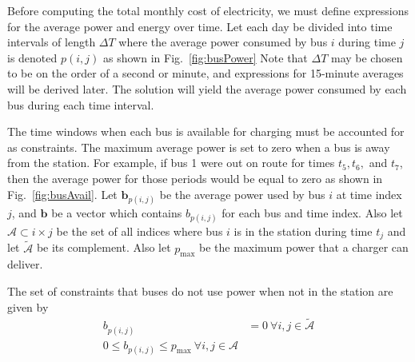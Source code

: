 Before computing the total monthly cost of electricity, we must define expressions for the average power and energy over time.  Let each day be divided into time intervals of length $\Delta T$ where the average power consumed by bus $i$ during time $j$ is denoted $p(i,j)$ as shown in Fig.~\ref{fig:busPower} Note that $\Delta T$ may be chosen to be on the order of a second or minute, and expressions for 15-minute averages will be derived later. The solution will yield the average power consumed by each bus during each time interval.
\par The time windows when each bus is available for charging must be accounted for as constraints.  The maximum average power is set to zero when a bus is away from the station. For example, if bus 1 were out on route for times $t_5, t_6,$ and $t_7$, then the average power for those periods would be equal to zero as shown in Fig.~\ref{fig:busAvail}. Let $\bm{b}_{p(i,j)}$ be the average power used by bus $i$ at time index $j$, and $\bm{b}$ be a vector which contains $b_{p(i,j)}$ for each bus and time index. Also let $\mathcal{A} \subset {i\times j}$  be the set of all indices where bus $i$ is in the station during time $t_j$ and let $\tilde{\mathcal{A}}$ be its complement. Also let $p_{\text{max}}$ be the maximum power that a charger can deliver. 
\par The set of constraints that buses do not use power when not in the station are given by
\begin{equation}\label{eqn:obj:power2}\begin{aligned}
	b_{p(i,j)} &= 0 \ \forall i,j \in \tilde{\mathcal{A}}  \\
	0 \leq b_{p(i,j)} \leq p_{\text{max}} \ \forall i,j \in \mathcal{A}
\end{aligned}\end{equation}

